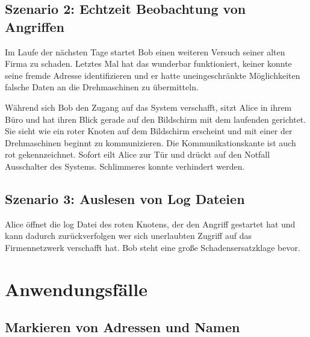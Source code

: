 \subsection{Szenario 2: Echtzeit Beobachtung von Angriffen}

Im Laufe der nächsten Tage startet Bob einen weiteren Versuch seiner alten Firma zu schaden. Letztes Mal hat das wunderbar funktioniert, keiner konnte seine fremde Adresse identifizieren und er hatte uneingeschränkte Möglichkeiten falsche Daten an die Drehmaschinen zu übermitteln.

Während sich Bob den Zugang auf das System verschafft, sitzt Alice in ihrem Büro und hat ihren Blick gerade auf den Bildschirm mit dem laufenden \programname gerichtet. Sie sieht wie ein roter Knoten auf dem Bildschirm erscheint und mit einer der Drehmaschinen beginnt zu kommunizieren. Die Kommunikationskante ist auch rot gekennzeichnet. Sofort eilt Alice zur Tür und drückt auf den Notfall Ausschalter des Systems. Schlimmeres konnte verhindert werden.

\subsection{Szenario 3: Auslesen von Log Dateien}

Alice öffnet die log Datei des roten Knotens, der den Angriff gestartet hat und kann dadurch zurückverfolgen wer sich unerlaubten Zugriff auf das Firmennetzwerk verschafft hat. Bob steht eine große Schadensersatzklage bevor.


\section{Anwendungsfälle}

\subsection{Markieren von Adressen und Namen}


